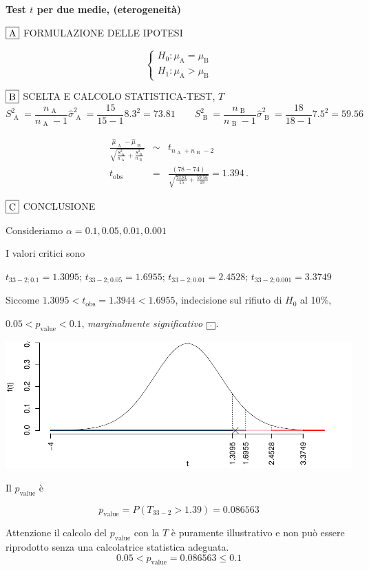 \documentclass[
  11pt,
]{book}
\theoremstyle{mytheoremstyle}
\theoremstyle{mydefstyle}
\newenvironment{sol}
  {
  \begin{tcolorbox}[enhanced,breakable,arc=0.1mm,boxrule=1pt,colback=white,colframe=iblue,
  title=\bf \fontfamily{lmss}\selectfont \hspace{.5 cm} Soluzione,drop fuzzy shadow]

}{
\end{tcolorbox}
  }
\begin{document}
\begin{sol}
\textbf{Test \(t\) per due medie, (eterogeneità)}

\(\fbox{A}\) FORMULAZIONE DELLE IPOTESI

\[\begin{cases}
   H_0: \mu_\text{A} = \mu_\text{B} \\
   H_1: \mu_\text{A} > \mu_\text{B} 
   \end{cases}\]

\(\fbox{B}\) SCELTA E CALCOLO STATISTICA-TEST, \(T\)
\[
     S^2_\text{ A }=\frac{n_\text{ A }}{n_\text{ A }-1}\hat\sigma^2_\text{ A }=\frac{ 15 }{ 15 -1} 8.3 ^2= 73.81  \qquad
     S^2_\text{ B }=\frac{n_\text{ B }}{n_\text{ B }-1}\hat\sigma^2_\text{ B }=\frac{ 18 }{ 18 -1} 7.5 ^2= 59.56 
   \]

\begin{eqnarray*}
   \frac{\hat\mu_\text{ A } - \hat\mu_\text{ B }}
   {\sqrt{\frac {S^2_\text{ A }}{n_\text{ A }}+\frac {S^2_\text{ B }}{n_\text{ B }}}}&\sim&t_{n_\text{ A }+n_\text{ B }-2}\\
   t_{\text{obs}}
   &=& \frac{ ( 78 -  74 )} {\sqrt{\frac{ 73.81 }{ 15 }+\frac{ 59.56 }{ 18 }}}
   =   1.394 \, .
   \end{eqnarray*}

\(\fbox{C}\) CONCLUSIONE

Consideriamo \(\alpha=0.1, 0.05, 0.01, 0.001\)

I valori critici sono

\(t_{33-2;0.1}=1.3095\); \(t_{33-2;0.05}=1.6955\); \(t_{33-2;0.01}=2.4528\); \(t_{33-2;0.001}=3.3749\)

Siccome \(1.3095<t_\text{obs}=1.3944<1.6955\), indecisione sul rifiuto di \(H_0\) al 10\%,

\(0.05<p_\text{value}<0.1\), \emph{marginalmente significativo} \(\fbox{.}\).

\begin{center}\includegraphics{Esami_passati_con_soluzioni_files/figure-latex/2024-30,-1} \end{center}

Il \(p_{\text{value}}\) è

\[ p_{\text{value}} = P(T_{33-2}>1.39)=0.086563 \]

Attenzione il calcolo del \(p_\text{value}\) con la \(T\) è puramente illustrativo e non può essere riprodotto senza una calcolatrice statistica adeguata.\[
 0.05 < p_\text{value}= 0.086563 \leq 0.1 
\]

\end{sol}
\end{document}
